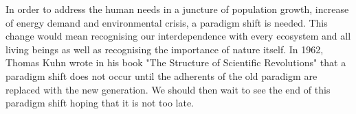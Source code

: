 In order to address the human needs in a juncture of population growth, increase of energy demand and environmental crisis, a paradigm shift is needed. This change would mean recognising our interdependence with every ecosystem and all living beings as well as recognising the importance of nature itself. In 1962, Thomas Kuhn wrote in his book  "The Structure of Scientific Revolutions" that a paradigm shift does not occur until the adherents of the old paradigm are replaced with the new generation. We should then wait to see the end of this paradigm shift hoping that it is not too late. 








